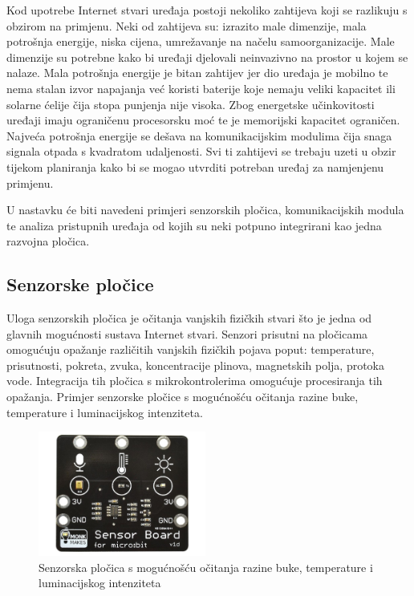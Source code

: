 \documentclass[times, utf8, diplomski]{fer}
\begin{document}
Kod upotrebe Internet stvari uređaja postoji nekoliko zahtijeva koji se razlikuju s obzirom na primjenu. Neki od zahtijeva su: izrazito male dimenzije, mala potrošnja energije, niska cijena, umrežavanje na načelu samoorganizacije. Male dimenzije su potrebne kako bi uređaji djelovali neinvazivno na prostor u kojem se nalaze. Mala potrošnja energije je bitan zahtijev jer dio uređaja je mobilno te nema stalan izvor napajanja već koristi baterije koje nemaju veliki kapacitet ili solarne ćelije čija stopa punjenja nije visoka. Zbog energetske učinkovitosti uređaji imaju ograničenu procesorsku moć te je memorijski kapacitet ograničen. Najveća potrošnja energije se dešava na komunikacijskim modulima čija snaga signala otpada s kvadratom udaljenosti. Svi ti zahtijevi se trebaju uzeti u obzir tijekom planiranja kako bi se mogao utvrditi potreban uređaj za namjenjenu primjenu.

U nastavku će biti navedeni primjeri senzorskih pločica, komunikacijskih modula te analiza pristupnih uređaja od kojih su neki potpuno integrirani kao jedna razvojna pločica.

\subsection{Senzorske pločice}
Uloga senzorskih pločica je očitanja vanjskih fizičkih stvari što je jedna od glavnih mogućnosti sustava Internet stvari. Senzori prisutni na pločicama omogućuju opažanje različitih vanjskih fizičkih pojava poput: temperature, prisutnosti, pokreta, zvuka, koncentracije plinova, magnetskih polja, protoka vode. Integracija tih pločica s mikrokontrolerima omogućuje procesiranja tih opažanja. Primjer senzorske pločice s mogućnošću očitanja razine buke, temperature i luminacijskog intenziteta.
\begin{figure}[htb]
    \centering
    \includegraphics[width=5.5cm]{images/sensor_board.jpg}
    \caption{Senzorska pločica s mogućnošću očitanja razine buke, temperature i luminacijskog intenziteta\citep{SensorBoard}}
    \label{fig:sensorboard}
\end{figure}
\end{document}
